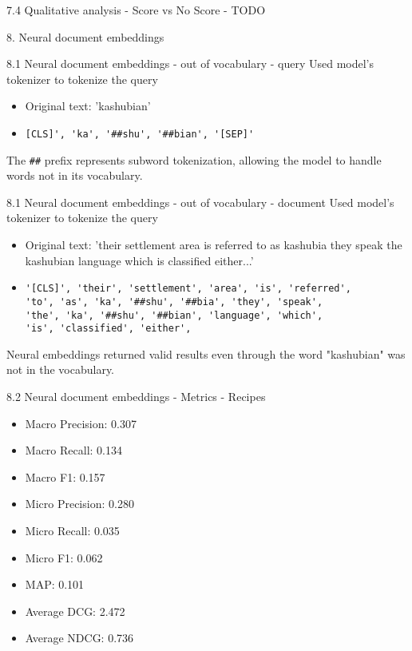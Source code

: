 \documentclass{beamer}
\begin{document}
\begin{frame}{7.4 Qualitative analysis - Score vs No Score - TODO }
\end{frame}

\begin{frame}{8. Neural document embeddings}
\end{frame}

\begin{frame}[fragile]{8.1 Neural document embeddings - out of vocabulary - query}
  Used model's tokenizer to tokenize the query
  \begin{itemize}
    \item Original text: 'kashubian'
      \item \begin{verbatim}[CLS]', 'ka', '##shu', '##bian', '[SEP]'\end{verbatim}
    \end{itemize}
    The \verb|##| prefix represents subword tokenization, allowing the model to handle words not in its vocabulary.
\end{frame}
\begin{frame}[fragile]{8.1 Neural document embeddings - out of vocabulary - document}
  Used model's tokenizer to tokenize the query
    \begin{itemize}
      \item Original text: 'their settlement area is referred to as kashubia they speak the kashubian language which is classified either...'
      \item \begin{verbatim}
'[CLS]', 'their', 'settlement', 'area', 'is', 'referred',
'to', 'as', 'ka', '##shu', '##bia', 'they', 'speak',
'the', 'ka', '##shu', '##bian', 'language', 'which',
'is', 'classified', 'either',\end{verbatim}
    \end{itemize}
    Neural embeddings returned valid results even through the word "kashubian" was not in the vocabulary.
\end{frame}

\begin{frame}{8.2 Neural document embeddings - Metrics - Recipes}
  \begin{itemize}
    \item Macro Precision: 0.307
    \item Macro Recall: 0.134
    \item Macro F1: 0.157
    \item Micro Precision: 0.280
    \item Micro Recall: 0.035
    \item Micro F1: 0.062
    \item MAP: 0.101
    \item Average DCG: 2.472
    \item Average NDCG: 0.736
  \end{itemize}
\end{frame}
\end{document}
